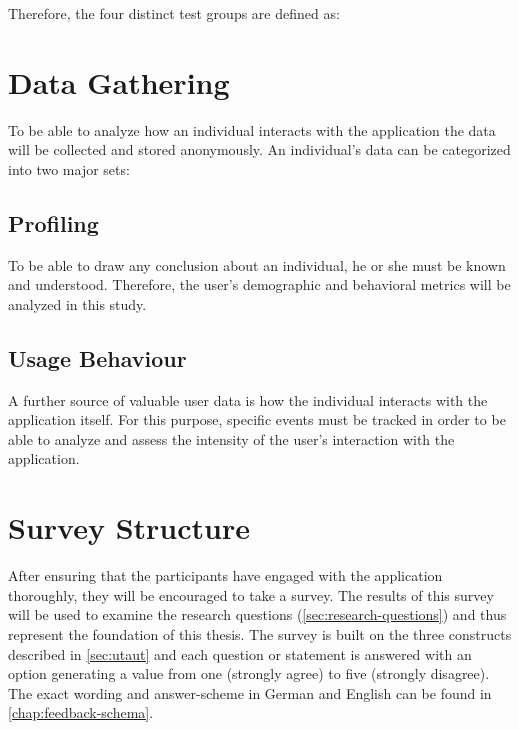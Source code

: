 Therefore, the four distinct test groups are defined as:



\section{Data Gathering}
To be able to analyze how an individual interacts with the application the data will be collected and stored anonymously. An individual’s data can be categorized into two major sets:

\subsection{Profiling}
\label{sub:profiling}
To be able to draw any conclusion about an individual, he or she must be known and understood. Therefore, the user’s demographic and behavioral metrics will be analyzed in this study.



\subsection{Usage Behaviour}
\label{sub:behaviour}
A further source of valuable user data is how the individual interacts with the application itself. For this purpose, specific events must be tracked in order to be able to analyze and assess the intensity of the user's interaction with the application.


\section{Survey Structure}
\label{sec:survey}
After ensuring that the participants have engaged with the application thoroughly, they will be encouraged to take a survey. The results of this survey will be used to examine the research questions (\cref{sec:research-questions}) and thus represent the foundation of this thesis. The survey is built on the three constructs described in \cref{sec:utaut} and each question or statement is answered with an option generating a value from one (strongly agree) to five (strongly disagree). The exact wording and answer-scheme in German and English can be found in \cref{chap:feedback-schema}.





